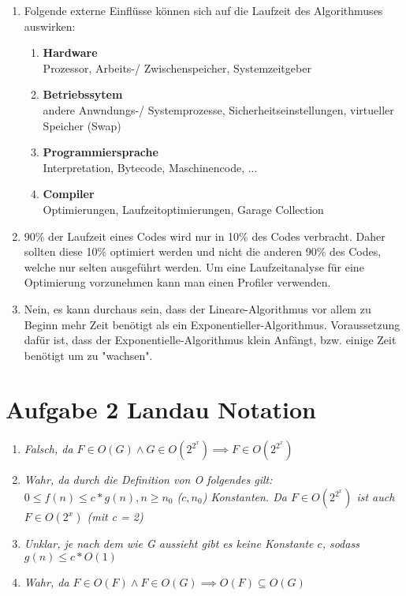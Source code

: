 \begin{enumerate}
	\item %
	Folgende externe Einflüsse können sich auf die Laufzeit des Algorithmuses auswirken:\\
	\begin{enumerate}
		\item \textbf{Hardware}\\
		Prozessor, Arbeits-/ Zwischenspeicher, Systemzeitgeber
		\item \textbf{Betriebssytem}\\
		andere Anwndungs-/ Systemprozesse, Sicherheitseinstellungen, virtueller Speicher (Swap)
		\item \textbf{Programmiersprache}\\
		Interpretation, Bytecode, Maschinencode, ...
		\item \textbf{Compiler}\\
		Optimierungen, Laufzeitoptimierungen, Garage Collection
	\end{enumerate}
	
	\item %
	90\% der Laufzeit eines Codes wird nur in 10\% des Codes verbracht. Daher sollten diese 10\% optimiert werden und nicht die anderen 90\% des Codes, welche nur selten ausgeführt werden. Um eine Laufzeitanalyse für eine Optimierung vorzunehmen kann man einen Profiler verwenden.
	
	\item %
	Nein, es kann durchaus sein, dass der Lineare-Algorithmus vor allem zu Beginn mehr Zeit benötigt als ein Exponentieller-Algorithmus. Voraussetzung dafür ist, dass der Exponentielle-Algorithmus klein Anfängt, bzw. einige Zeit benötigt um zu "wachsen".
\end{enumerate}

\section*{Aufgabe 2  Landau Notation}
\begin{enumerate}
	\item
	\textit{Falsch, da $F \in O(G) \land G \in O(2^{2^x}) \implies F \in O(2^{2^x})$}
	\item
	\textit{Wahr, da durch die Definition von O folgendes gilt: $0 \leq f(n) \leq c*g(n), n\geq n_0$ ($c, n_0$) Konstanten. Da $F \in O(2^{2^x})$ ist auch $F \in O(2^x)$ (mit c = 2)}
	\item
	\textit{Unklar, je nach dem wie G aussieht gibt es keine Konstante $c$, sodass $g(n) \leq c * O(1)$}
	\item
	\textit{Wahr, da $F \in O(F) \land F \in O(G) \implies O(F) \subseteq O(G) $}
\end{enumerate}

